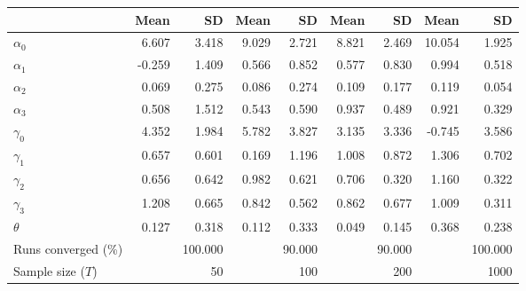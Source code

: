 
\begin{tabular}[t]{lrrrrrrrr}
\toprule
  & Mean & SD & Mean  & SD  & Mean   & SD   & Mean    & SD   \\
\midrule
$\alpha_{0}$ & 6.607 & 3.418 & 9.029 & 2.721 & 8.821 & 2.469 & 10.054 & 1.925\\
$\alpha_{1}$ & -0.259 & 1.409 & 0.566 & 0.852 & 0.577 & 0.830 & 0.994 & 0.518\\
$\alpha_{2}$ & 0.069 & 0.275 & 0.086 & 0.274 & 0.109 & 0.177 & 0.119 & 0.054\\
$\alpha_{3}$ & 0.508 & 1.512 & 0.543 & 0.590 & 0.937 & 0.489 & 0.921 & 0.329\\
$\gamma_{0}$ & 4.352 & 1.984 & 5.782 & 3.827 & 3.135 & 3.336 & -0.745 & 3.586\\
$\gamma_{1}$ & 0.657 & 0.601 & 0.169 & 1.196 & 1.008 & 0.872 & 1.306 & 0.702\\
$\gamma_{2}$ & 0.656 & 0.642 & 0.982 & 0.621 & 0.706 & 0.320 & 1.160 & 0.322\\
$\gamma_{3}$ & 1.208 & 0.665 & 0.842 & 0.562 & 0.862 & 0.677 & 1.009 & 0.311\\
$\theta$ & 0.127 & 0.318 & 0.112 & 0.333 & 0.049 & 0.145 & 0.368 & 0.238\\
Runs converged (\%) &  & 100.000 &  & 90.000 &  & 90.000 &  & 100.000\\
Sample size ($T$) &  & 50 &  & 100 &  & 200 &  & 1000\\
\bottomrule
\end{tabular}
